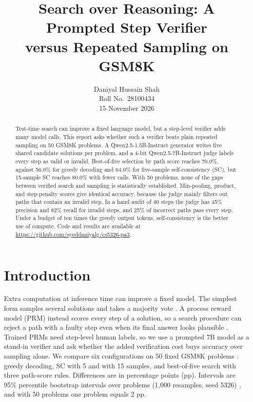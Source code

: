 \documentclass{article}
\title{Search over Reasoning: A Prompted Step Verifier\\versus Repeated Sampling on GSM8K}
\author{Daniyal Hussain Shah\\Roll No.\ 28100434\\15 November 2026}
\begin{document}
\maketitle

\begin{abstract}
Test-time search can improve a fixed language model, but a step-level verifier adds many model calls. This report asks whether such a verifier beats plain repeated sampling on 50 GSM8K problems. A Qwen2.5-1.5B-Instruct generator writes five shared candidate solutions per problem, and a 4-bit Qwen2.5-7B-Instruct judge labels every step as valid or invalid. Best-of-five selection by path score reaches 70.0\%, against 56.0\% for greedy decoding and 64.0\% for five-sample self-consistency (SC), but 15-sample SC reaches 80.0\% with fewer calls. With 50 problems, none of the gaps between verified search and sampling is statistically established. Min-pooling, product, and step-penalty scores give identical accuracy, because the judge mainly filters out paths that contain an invalid step. In a hand audit of 40 steps the judge has 45\% precision and 82\% recall for invalid steps, and 25\% of incorrect paths pass every step. Under a budget of ten times the greedy output tokens, self-consistency is the better use of compute. Code and results are available at \url{https://github.com/syeddaniyalg/cs5326-pa3}.
\end{abstract}

\section{Introduction}
Extra computation at inference time can improve a fixed model. The simplest form samples several solutions and takes a majority vote \citep{wang2023selfconsistency,brown2024monkeys,snell2024scaling}. A process reward model (PRM) instead scores every step of a solution, so a search procedure can reject a path with a faulty step even when its final answer looks plausible \citep{lightman2023verify}. Trained PRMs need step-level human labels, so we use a prompted 7B model as a stand-in verifier and ask whether the added verification cost buys accuracy over sampling alone. We compare six configurations on 50 fixed GSM8K problems \citep{cobbe2021gsm8k}: greedy decoding, SC with 5 and with 15 samples, and best-of-five search with three path-score rules. Differences are in percentage points (pp). Intervals are 95\% percentile bootstrap intervals over problems (1,000 resamples, seed 5326) \citep{efron1993bootstrap}, and with 50 problems one problem equals 2 pp.
\end{document}
